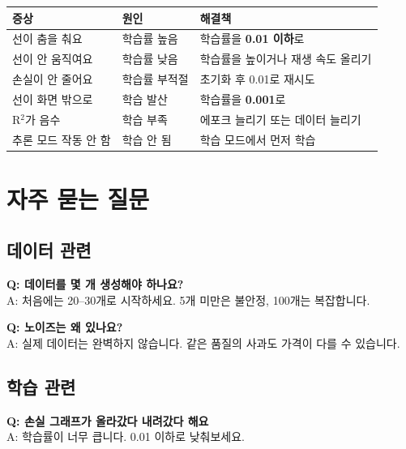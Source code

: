 \documentclass[11pt, a4paper]{article}
\begin{document}
\vspace{0.3cm}

\begin{center}
\begin{tabular}{llp{5cm}}
    \toprule
    \textbf{증상} & \textbf{원인} & \textbf{해결책} \\
    \midrule
    선이 춤을 춰요 & 학습률 높음 & 학습률을 \textbf{0.01 이하}로 \\
    선이 안 움직여요 & 학습률 낮음 & 학습률을 높이거나 재생 속도 올리기 \\
    손실이 안 줄어요 & 학습률 부적절 & 초기화 후 0.01로 재시도 \\
    선이 화면 밖으로 & 학습 발산 & 학습률을 \textbf{0.001}로 \\
    R$^2$가 음수 & 학습 부족 & 에포크 늘리기 또는 데이터 늘리기 \\
    추론 모드 작동 안 함 & 학습 안 됨 & 학습 모드에서 먼저 학습 \\
    \bottomrule
\end{tabular}
\end{center}

\section{자주 묻는 질문}

\subsection{데이터 관련}

\textbf{Q: 데이터를 몇 개 생성해야 하나요?}\\
A: 처음에는 20--30개로 시작하세요. 5개 미만은 불안정, 100개는 복잡합니다.

\vspace{0.3cm}

\textbf{Q: 노이즈는 왜 있나요?}\\
A: 실제 데이터는 완벽하지 않습니다. 같은 품질의 사과도 가격이 다를 수 있습니다.

\subsection{학습 관련}

\textbf{Q: 손실 그래프가 올라갔다 내려갔다 해요}\\
A: 학습률이 너무 큽니다. 0.01 이하로 낮춰보세요.
\end{document}
